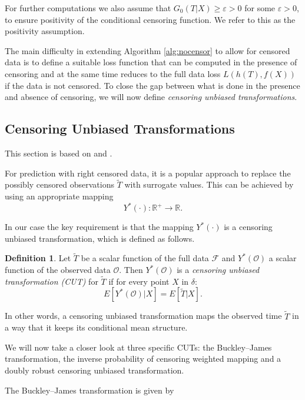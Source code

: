 \documentclass[12pt, a4paper]{scrartcl}
\theoremstyle{definition}
\newtheorem{Definition}{Definition}[section]
\theoremstyle{plain}
\numberwithin{equation}{section}
\numberwithin{figure}{section}
\numberwithin{table}{section}
\begin{document}
	 For further computations we also assume that $G_0(T \vert X)\geq \varepsilon > 0$ for some $\varepsilon >0$, to ensure positivity of the conditional censoring function.
	 We refer to this as the positivity assumption.
	
	The main difficulty in extending Algorithm \ref{alg:nocensor} to allow for censored data is to define a suitable loss function that can be computed in the presence of censoring and at the same time reduces to the full data loss $L(h(T), f(X))$ if the data is not censored.
	To close the gap between what is done in the presence and absence of censoring, we will now define \textit{censoring unbiased transformations}.
	
	\subsection{Censoring Unbiased Transformations}\label{sec:drtrafo}
	This section is based on \citet*{culs} and \citet*{drcut}.
	
	For prediction with right censored data, it is a popular approach to replace the possibly censored observations $\tilde T$ with surrogate values.
	This can be achieved by using an appropriate mapping $$Y^*(\cdot): \mathbb{R}^+ \to \mathbb{R}.$$
	
	In our case the key requirement is that the mapping $Y^*(\cdot)$ is a censoring unbiased transformation, which is defined as follows.
	
	\begin{Definition}
	Let $\tilde T$ be a scalar function of the full data $\mathcal{F}$ and $Y^*(\mathcal{O})$ a scalar function of the observed data $\mathcal{O}$.
	Then $Y^*(\mathcal{O})$ is a \textit{censoring unbiased transformation (CUT)} for $\tilde T$ if for every point $X$ in $\delta$:
	\begin{equation*}
	E[Y^*(\mathcal{O}) \vert X] = E[\tilde T \vert X].
	\end{equation*}
	\end{Definition}

	In other words, a censoring unbiased transformation maps the observed time $\tilde T$ in a way that it keeps its conditional mean structure.
	
	We will now take a closer look at three specific CUTs: the Buckley--James transformation, the inverse probability of censoring weighted mapping and a doubly robust censoring unbiased transformation.
	
	The Buckley--James transformation is given by
	
\end{document}
